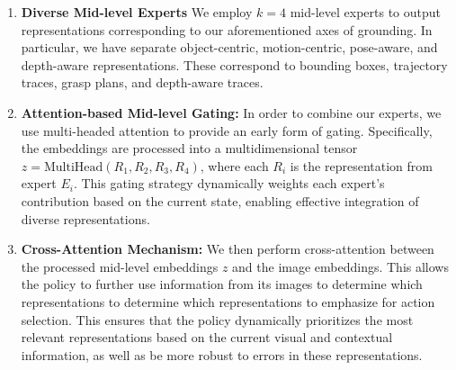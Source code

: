 \documentclass[conference,dvipsnames]{IEEEtran}
\begin{document}
\begin{enumerate}
    \item \textbf{Diverse Mid-level Experts} We employ $k = 4$ mid-level experts to output representations corresponding to our aforementioned axes of grounding. In particular, we have separate object-centric, motion-centric, pose-aware, and depth-aware representations. These correspond to bounding boxes, trajectory traces, grasp plans, and depth-aware traces. 
    
    \item \textbf{Attention-based Mid-level Gating:} In order to combine our experts, we use multi-headed attention to provide an early form of gating. Specifically, the embeddings are processed into a multidimensional tensor $z = \text{MultiHead}(R_1, R_2, R_3, R_4)$, where each \( R_i \) is the representation from expert \( E_i \). This gating strategy dynamically weights each expert's contribution based on the current state, enabling effective integration of diverse representations.
    
    \item \textbf{Cross-Attention Mechanism:} We then perform cross-attention between the processed mid-level embeddings $z$ and the image embeddings. This allows the policy to further use information from its images to determine which representations to determine which representations to emphasize for action selection. This ensures that the policy dynamically prioritizes the most relevant representations based on the current visual and contextual information, as well as be more robust to errors in these representations. 
\end{enumerate}
\end{document}
